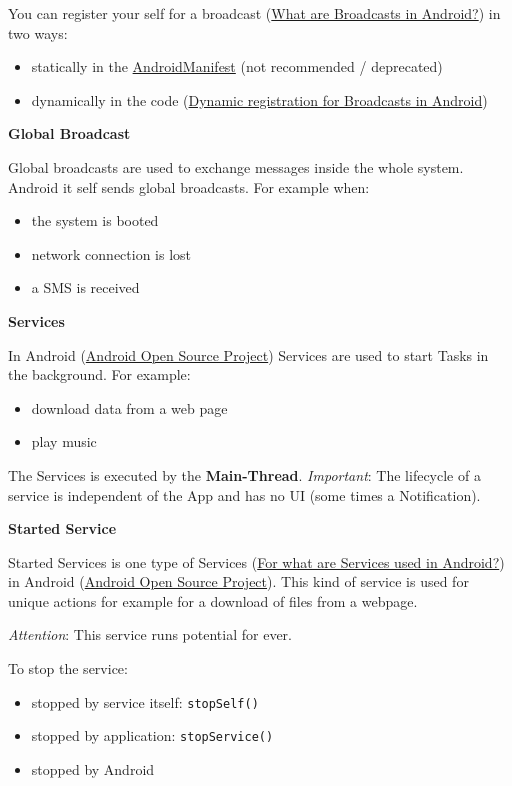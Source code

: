 \documentclass[11pt,twoside,landscape]{article}
\begin{document}
\begin{multicols}{3}
You can register your self for a broadcast (\href{../../../roam/20211029100710-what_are_broadcasts_in_android.org}{What are Broadcasts in Android?}) in two ways:
\begin{itemize}
\item statically in the \href{../../../roam/20210921175054-androidmanifest.org}{AndroidManifest} (not recommended / deprecated)
\item dynamically in the code (\href{../../../roam/20211103170117-dynamic_registration_for_broadcasts_in_android.org}{Dynamic registration for Broadcasts in Android})
\end{itemize}

\textbf{Global Broadcast}

Global broadcasts are used to exchange messages inside the whole system.
Android it self sends global broadcasts. For example when:
\begin{itemize}
\item the system is booted
\item network connection is lost
\item a SMS is received
\end{itemize}


\textbf{Services}

In Android (\href{../../../roam/20210921143632-aosp.org}{Android Open Source Project}) Services are used to start Tasks in the background.
For example:
\begin{itemize}
\item download data from a web page
\item play music
\end{itemize}


The Services is executed by the \textbf{Main-Thread}.
\emph{Important}: The lifecycle of a service is independent of the App and has no UI (some times a Notification).

\textbf{Started Service}

Started Services is one type of Services (\href{../../../roam/20211109103648-for_what_are_services_used_in_android.org}{For what are Services used in Android?}) in Android (\href{../../../roam/20210921143632-aosp.org}{Android Open Source Project}).
This kind of service is used for unique actions for example for a download of files from a webpage.

\emph{Attention}: This service runs potential for ever.

To stop the service:
\begin{itemize}
\item stopped by service itself: \texttt{stopSelf()}
\item stopped by application: \texttt{stopService()}
\item stopped by Android
\end{itemize}


\end{multicols}
\end{document}
